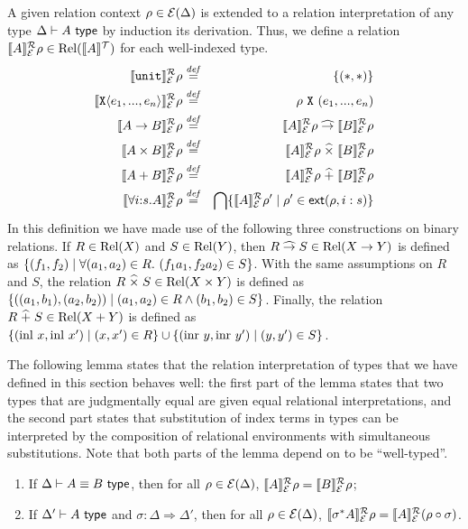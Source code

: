 A given relation context $\rho \in \mathcal{E}(\Delta)$ is extended to
a relation interpretation of any type $\Delta \vdash A \textsf{ type}$ by
induction its derivation. Thus, we define a relation
$\llbracket A \rrbracket^{\mathcal{R}}_{\mathcal{E}}{\rho} \in \mathrm{Rel}(\llbracket A \rrbracket^{\mathcal{T}})$ for each well-indexed
type.
\begin{eqnarray*}
  \llbracket \texttt{unit} \rrbracket^{\mathcal{R}}_{\mathcal{E}}{\rho} & \stackrel{\mathit{def}}= & \{(*,*)\} \\
  \llbracket \texttt{X}\langle e_1,...,e_n \rangle \rrbracket^{\mathcal{R}}_{\mathcal{E}}{\rho} & \stackrel{\mathit{def}}= & \rho\ {\texttt{X}}\ (e_1,...,e_n) \\
  \llbracket A \to B \rrbracket^{\mathcal{R}}_{\mathcal{E}}{\rho} & \stackrel{\mathit{def}}= & \llbracket A \rrbracket^{\mathcal{R}}_{\mathcal{E}}{\rho} \mathrel{\widehat\to} \llbracket B \rrbracket^{\mathcal{R}}_{\mathcal{E}}{\rho} \\
  \llbracket A \times B \rrbracket^{\mathcal{R}}_{\mathcal{E}}{\rho} & \stackrel{\mathit{def}}= & \llbracket A \rrbracket^{\mathcal{R}}_{\mathcal{E}}{\rho} \mathrel{\widehat\times} \llbracket B \rrbracket^{\mathcal{R}}_{\mathcal{E}}{\rho} \\
  \llbracket A + B \rrbracket^{\mathcal{R}}_{\mathcal{E}}{\rho} & \stackrel{\mathit{def}}= & \llbracket A \rrbracket^{\mathcal{R}}_{\mathcal{E}}{\rho} \mathrel{\widehat+} \llbracket B \rrbracket^{\mathcal{R}}_{\mathcal{E}}{\rho} \\
  \llbracket \forall i\mathord:s.A \rrbracket^{\mathcal{R}}_{\mathcal{E}}{\rho} & \stackrel{\mathit{def}}= & \bigcap\{ \llbracket A \rrbracket^{\mathcal{R}}_{\mathcal{E}}{\rho}' \mathrel| \rho' \in \mathsf{ext}(\rho,i:s) \}
\end{eqnarray*}
In this definition we have made use of the following three
constructions on binary relations. If $R \in \mathrm{Rel}(X)$ and $S \in
\mathrm{Rel}(Y)$, then $R \mathrel{\widehat\to} S \in \mathrm{Rel}(X \to Y)$ is defined as $\{
(f_1,f_2) \mathrel| \forall (a_1,a_2) \in R.\ (f_1a_1,f_2a_2) \in S
\}$. With the same assumptions on $R$ and $S$, the relation $R
\mathrel{\widehat\times} S \in \mathrm{Rel}(X \times Y)$ is defined as $\{
((a_1,b_1),(a_2,b_2)) \mathrel| (a_1,a_2) \in R \land (b_1,b_2) \in S
\}$. Finally, the relation $R \mathrel{\widehat+} S \in \mathrm{Rel}(X + Y)$ is defined as
$\{ (\mathrm{inl}\ x, \mathrm{inl}\ x') \mathrel| (x,x') \in R \} \cup
\{ (\mathrm{inr}\ y, \mathrm{inr}\ y') \mathrel| (y,y') \in S \}$.

The following lemma states that the relation interpretation of types
that we have defined in this section behaves well: the first part of
the lemma states that two types that are judgmentally equal are given
equal relational interpretations, and the second part states that
substitution of index terms in types can be interpreted by the
composition of relational environments with simultaneous
substitutions. Note that both parts of the lemma depend on
 to be ``well-typed''.
\begin{lemma}\label{lem:tyeqsubst-relational}
  \begin{enumerate}
  \item If $\Delta \vdash A \equiv B \textsf{ type}$, then for all $\rho \in
    \mathcal{E}(\Delta)$, $\llbracket A \rrbracket^{\mathcal{R}}_{\mathcal{E}}{\rho} =
    \llbracket B \rrbracket^{\mathcal{R}}_{\mathcal{E}}{\rho}$;
  \item If $\Delta' \vdash A \textsf{ type}$ and $\sigma : \Delta \Rightarrow
    \Delta'$, then for all $\rho \in \mathcal{E}(\Delta)$,
    $\llbracket \sigma^*A \rrbracket^{\mathcal{R}}_{\mathcal{E}}{\rho} = \llbracket A \rrbracket^{\mathcal{R}}_{\mathcal{E}}{(}\rho
    \circ \sigma)$.
  \end{enumerate}
\end{lemma}

